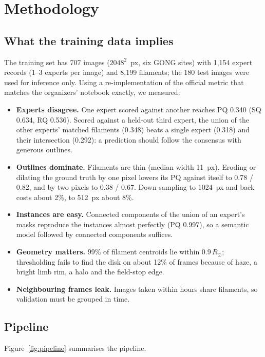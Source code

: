 \documentclass[sigconf]{acmart}
\begin{document}
\section{Methodology}\label{sec:methodology}

\subsection{What the training data implies}\label{sec:analysis}
The training set has 707 images ($2048^2$~px, six GONG sites) with 1,154 expert records (1--3 experts per image) and 8,199 filaments; the 180 test images were used for inference only. Using a re-implementation of the official metric that matches the organizers' notebook exactly, we measured:
\begin{itemize}
    \item \textbf{Experts disagree.} One expert scored against another reaches PQ 0.340 (SQ 0.634, RQ 0.536). Scored against a held-out third expert, the union of the other experts' matched filaments (0.348) beats a single expert (0.318) and their intersection (0.292): a prediction should follow the consensus with generous outlines.
    \item \textbf{Outlines dominate.} Filaments are thin (median width 11~px). Eroding or dilating the ground truth by one pixel lowers its PQ against itself to 0.78 / 0.82, and by two pixels to 0.38 / 0.67. Down-sampling to 1024~px and back costs about 2\%, to 512~px about 8\%.
    \item \textbf{Instances are easy.} Connected components of the union of an expert's masks reproduce the instances almost perfectly (PQ 0.997), so a semantic model followed by connected components suffices.
    \item \textbf{Geometry matters.} 99\% of filament centroids lie within $0.9\,R_\odot$; thresholding fails to find the disk on about 12\% of frames because of haze, a bright limb rim, a halo and the field-stop edge.
    \item \textbf{Neighbouring frames leak.} Images taken within hours share filaments, so validation must be grouped in time.
\end{itemize}

\subsection{Pipeline}
Figure~\ref{fig:pipeline} summarises the pipeline.
\end{document}
